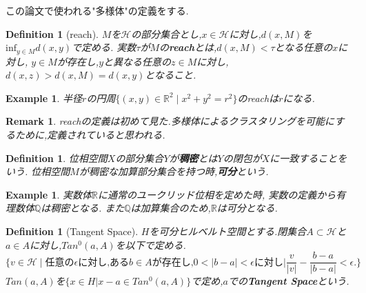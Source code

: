 \documentclass{ujarticle}
\newtheorem{dfn}[thm]{Definition}
\newtheorem{epl}[thm]{Example}
\newtheorem*{rem}{Remark}
\begin{document}
この論文で使われる"多様体"の定義をする.
\begin{dfn}[reach]
  $M$を$\mathcal{H}$の部分集合とし,$x\in \mathcal{H}$に対し,$d(x,M)$を$\mathrm{inf}_{y \in M}d(x,y)$で定める.
  実数$\tau$が$M$の\textbf{reach}とは,$d(x,M)< \tau$となる任意の$x$に対し,
  $y\in M$が存在し,$y$と異なる任意の$z\in M$に対し,$d(x,z) > d(x,M)=d(x,y)$となること.
\end{dfn}
\begin{epl}
 半径$r$の円周$\{(x,y) \in \mathbb{R}^2 \mid x^2+y^2=r^2 \}$のreachは$r$になる.
\end{epl}
\begin{rem}
 reachの定義は初めて見た.多様体によるクラスタリングを可能にするために,定義されていると思われる.
\end{rem}
\begin{dfn}
 位相空間$X$の部分集合$Y$が\textbf{稠密}とは$Y$の閉包が$X$に一致することをいう.
 位相空間$M$が稠密な加算部分集合を持つ時,\textbf{可分}という.
\end{dfn}
\begin{epl}
 実数体$\mathbb{R}$に通常のユークリッド位相を定めた時,
 実数の定義から有理数体$\mathbb{Q}$は稠密となる.
 また$\mathbb{Q}$は加算集合のため,$\mathbb{R}$は可分となる.
\end{epl}

\begin{dfn}[Tangent Space]
$H$を可分ヒルベルト空間とする.閉集合$A \subset \mathcal{H}$と$a \in A$に対し,$Tan^0(a,A)$を以下で定める.
\begin{equation*}
  \{ v \in \mathcal{H} \mid \mbox{任意の} \epsilon \mbox{に対し,ある} b \in A \mbox{が存在し,}
  0 <| b- a| < \epsilon \mbox{に対し} |\frac{v}{|v|} - \frac{b-a}{|b-a|} < \epsilon.\}
\end{equation*}
$Tan(a,A)$を$\{x \in H| x -a \in Tan^0(a,A)\}$で定め,$a$での\textbf{Tangent Space}という.
\end{dfn}
\end{document}
